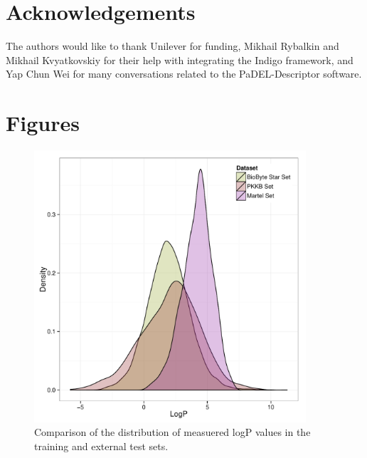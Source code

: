 \documentclass[10pt]{bmc_article}
\newenvironment{bmcformat}{\begin{raggedright}\baselineskip20pt\sloppy\setboolean{publ}{false}}{\end{raggedright}\baselineskip20pt\sloppy}
\begin{document}
\begin{bmcformat}
\section*{Acknowledgements}
The authors would like to thank Unilever for funding, Mikhail Rybalkin and Mikhail Kvyatkovskiy for their help with integrating the Indigo framework, and Yap Chun Wei for many conversations related to the PaDEL-Descriptor software. 
 
\newpage
{
 
  
}

\newpage
\section*{Figures}

\begin{figure}[ht]
  \centering
  \includegraphics[width=0.9\textwidth]{./Figures/logP_distributions.pdf}
  \caption{Comparison of the distribution of measuered logP values in the training and external test sets.}
  \label{fig:distribution_comparison}
\end{figure}


\end{bmcformat}
\end{document}
